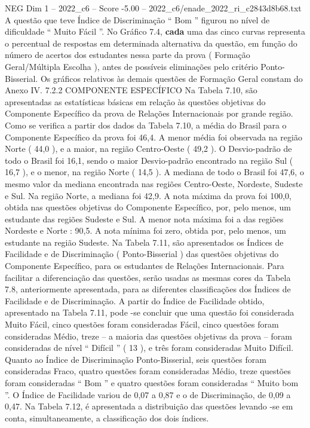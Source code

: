 \begin{textsample}{NEG Dim 1 – 2022\_c6 – Score -5.00 – 2022\_c6/enade\_2022\_ri\_c2843d8b68.txt}
A questão que teve Índice de Discriminação “ Bom ” figurou no nível de dificuldade “ Muito Fácil ”.
No Gráfico 7.4, \textbf{cada} uma das cinco curvas representa o percentual de respostas em determinada alternativa da questão, em função do número de acertos dos estudantes nessa parte da prova ( Formação Geral/Múltipla Escolha ), antes de possíveis eliminações pelo critério Ponto-Bisserial.
Os gráficos relativos às demais questões de Formação Geral constam do Anexo IV. 7.2.2 COMPONENTE ESPECÍFICO Na Tabela 7.10, são apresentadas as estatísticas básicas em relação às questões objetivas do Componente Específico da prova de Relações Internacionais por grande região.
Como se verifica a partir dos dados da Tabela 7.10, a média do Brasil para o Componente Específico da prova foi 46,4.
A menor média foi observada na região Norte ( 44,0 ), e a maior, na região Centro-Oeste ( 49,2 ).
O Desvio-padrão de todo o Brasil foi 16,1, sendo o maior Desvio-padrão encontrado na região Sul ( 16,7 ), e o menor, na região Norte ( 14,5 ).
A mediana de todo o Brasil foi 47,6, o mesmo valor da mediana encontrada nas regiões Centro-Oeste, Nordeste, Sudeste e Sul.
Na região Norte, a mediana foi 42,9.
A nota máxima da prova foi 100,0, obtida nas questões objetivas do Componente Específico, por, pelo menos, um estudante das regiões Sudeste e Sul.
A menor nota máxima foi a das regiões Nordeste e Norte : 90,5.
A nota mínima foi zero, obtida por, pelo menos, um estudante na região Sudeste.
Na Tabela 7.11, são apresentados os Índices de Facilidade e de Discriminação ( Ponto-Bisserial ) das questões objetivas do Componente Específico, para os estudantes de Relações Internacionais.
Para facilitar a diferenciação das questões, serão usadas as mesmas cores da Tabela 7.8, anteriormente apresentada, para as diferentes classificações dos Índices de Facilidade e de Discriminação.
A partir do Índice de Facilidade obtido, apresentado na Tabela 7.11, pode -se concluir que uma questão foi considerada Muito Fácil, cinco questões foram consideradas Fácil, cinco questões foram consideradas Médio, treze – a maioria das questões objetivas da prova – foram consideradas de nível “ Difícil ” ( 13 ), e três foram consideradas Muito Difícil.
Quanto ao Índice de Discriminação Ponto-Bisserial, seis questões foram consideradas Fraco, quatro questões foram consideradas Médio, treze questões foram consideradas “ Bom ” e quatro questões foram consideradas “ Muito bom ”.
O Índice de Facilidade variou de 0,07 a 0,87 e o de Discriminação, de 0,09 a 0,47.
Na Tabela 7.12, é apresentada a distribuição das questões levando -se em conta, simultaneamente, a classificação dos dois índices.

\end{textsample}
